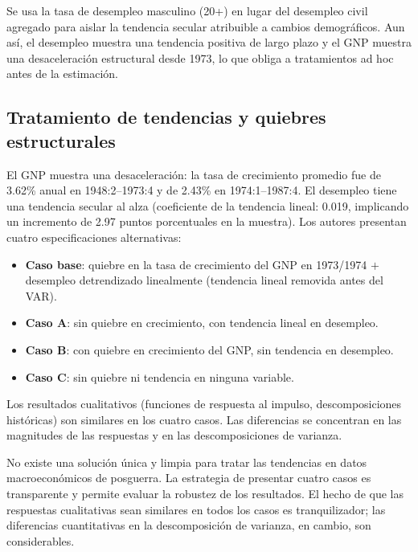 \documentclass[12pt]{article}
\begin{document}
\begin{intuicion}
Se usa la tasa de desempleo masculino (20+) en lugar del desempleo civil agregado para aislar la tendencia secular atribuible a cambios demogr\'aficos. Aun as\'i, el desempleo muestra una tendencia positiva de largo plazo y el GNP muestra una desaceleraci\'on estructural desde 1973, lo que obliga a tratamientos ad hoc antes de la estimaci\'on.
\end{intuicion}

\subsection{Tratamiento de tendencias y quiebres estructurales}

El GNP muestra una desaceleraci\'on: la tasa de crecimiento promedio fue de 3.62\% anual en 1948:2--1973:4 y de 2.43\% en 1974:1--1987:4. El desempleo tiene una tendencia secular al alza (coeficiente de la tendencia lineal: 0.019, implicando un incremento de 2.97 puntos porcentuales en la muestra). Los autores presentan cuatro especificaciones alternativas:

\begin{itemize}
  \item \textbf{Caso base}: quiebre en la tasa de crecimiento del GNP en 1973/1974 $+$ desempleo detrendizado linealmente (tendencia lineal removida antes del VAR).
  \item \textbf{Caso A}: sin quiebre en crecimiento, con tendencia lineal en desempleo.
  \item \textbf{Caso B}: con quiebre en crecimiento del GNP, sin tendencia en desempleo.
  \item \textbf{Caso C}: sin quiebre ni tendencia en ninguna variable.
\end{itemize}

Los resultados cualitativos (funciones de respuesta al impulso, descomposiciones hist\'oricas) son similares en los cuatro casos. Las diferencias se concentran en las magnitudes de las respuestas y en las descomposiciones de varianza.

\begin{intuicion}
No existe una soluci\'on \'unica y limpia para tratar las tendencias en datos macroecon\'omicos de posguerra. La estrategia de presentar cuatro casos es transparente y permite evaluar la robustez de los resultados. El hecho de que las respuestas cualitativas sean similares en todos los casos es tranquilizador; las diferencias cuantitativas en la descomposici\'on de varianza, en cambio, son considerables.
\end{intuicion}
\end{document}
